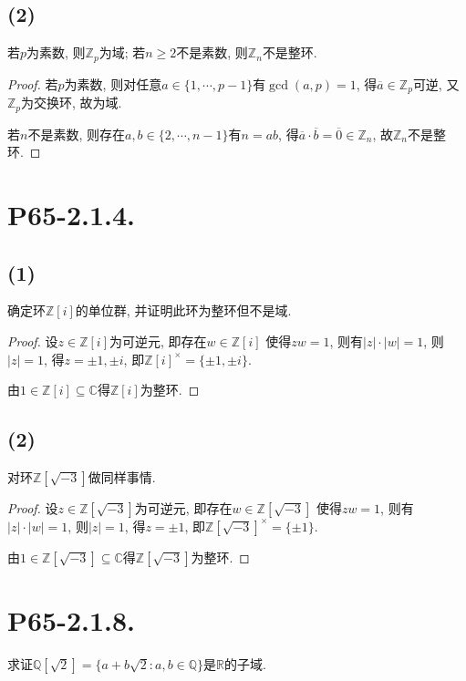\documentclass[12pt, a4paper, fontset=windows]{ctexart}
\newcommand{\C}{\mathbb{C}}
\newcommand{\Q}{\mathbb{Q}}
\newcommand{\R}{\mathbb{R}}
\newcommand{\Z}{\mathbb{Z}}
\newcommand{\abs}[1]{\left|{#1}\right|}
\newcommand{\cl}[1]{\overline{#1}} %
\newcommand{\unit}[1]{{#1}^\times}
\begin{document}
\subsection*{(2)}

若$p$为素数, 则$\Z_p$为域; 若$n\ge 2$不是素数, 则$\Z_n$不是整环. 

\begin{proof}
若$p$为素数, 则对任意$a\in\{1,\cdots,p-1\}$有$\gcd(a,p)=1$, 
得$\cl{a}\in\Z_p$可逆, 又$\Z_p$为交换环, 故为域. 

若$n$不是素数, 则存在$a,b\in\{2,\cdots,n-1\}$有$n=ab$, 
得$\cl{a}\cdot\cl{b}=\cl{0}\in\Z_n$, 故$\Z_n$不是整环. 
\end{proof}

\section*{P65-2.1.4.}

\subsection*{(1)}

确定环$\Z[i]$的单位群, 并证明此环为整环但不是域. 

\begin{proof}
设$z\in\Z[i]$为可逆元, 即存在$w\in\Z[i]$
使得$zw=1$, 则有$\abs{z}\cdot\abs{w}=1$, 
则$\abs{z}=1$, 得$z=\pm 1,\pm i$, 
即$\unit{\Z[i]}=\{\pm 1,\pm i\}$. 

由$1\in\Z[i]\subseteq\C$得$\Z[i]$为整环. 
\end{proof}

\subsection*{(2)}

对环$\Z[\sqrt{-3}]$做同样事情. 

\begin{proof}
设$z\in\Z[\sqrt{-3}]$为可逆元, 即存在$w\in\Z[\sqrt{-3}]$
使得$zw=1$, 则有$\abs{z}\cdot\abs{w}=1$, 
则$\abs{z}=1$, 得$z=\pm 1$, 
即$\unit{\Z[\sqrt{-3}]}=\{\pm 1\}$. 

由$1\in\Z[\sqrt{-3}]\subseteq\C$得$\Z[\sqrt{-3}]$为整环. 
\end{proof}

\section*{P65-2.1.8.}
\label{Qsqrt2}

求证$\Q[\sqrt{2}]=\{a+b\sqrt{2}:a,b\in\Q\}$是$\R$的子域. 
\end{document}
